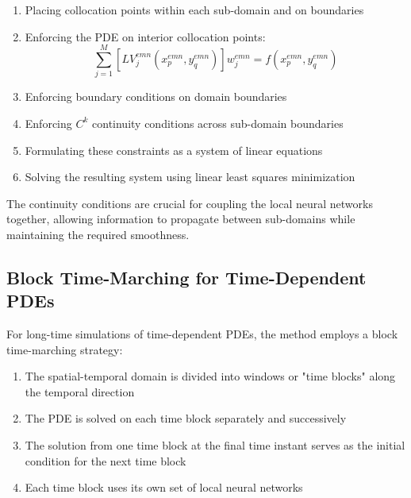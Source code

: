 \documentclass[11pt,a4paper]{article}
\begin{document}
\begin{enumerate}
    \item Placing collocation points within each sub-domain and on boundaries
    
    \item Enforcing the PDE on interior collocation points:
    \begin{equation}
        \sum_{j=1}^{M} [L V^{emn}_j(x^{emn}_p, y^{emn}_q)] w^{emn}_j = f(x^{emn}_p, y^{emn}_q)
    \end{equation}
    
    \item Enforcing boundary conditions on domain boundaries
    
    \item Enforcing $C^k$ continuity conditions across sub-domain boundaries
    
    \item Formulating these constraints as a system of linear equations
    
    \item Solving the resulting system using linear least squares minimization
\end{enumerate}

The continuity conditions are crucial for coupling the local neural networks together, allowing information to propagate between sub-domains while maintaining the required smoothness.

\subsection{Block Time-Marching for Time-Dependent PDEs}
For long-time simulations of time-dependent PDEs, the method employs a block time-marching strategy:

\begin{enumerate}
    \item The spatial-temporal domain is divided into windows or "time blocks" along the temporal direction
    
    \item The PDE is solved on each time block separately and successively 
    
    \item The solution from one time block at the final time instant serves as the initial condition for the next time block
    
    \item Each time block uses its own set of local neural networks
\end{enumerate}
\end{document}
